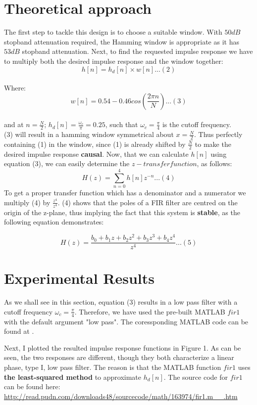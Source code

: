 \documentclass[12pt]{IEEEtran}
\begin{document}
\section{Theoretical approach}
The first step to tackle this design is to choose a suitable window. With $ 50 dB$ stopband attenuation required, the Hamming window is appropriate as it has $53 dB$ stopband attenuation. Next, to find the requested impulse response we have to multiply both the desired impulse response and the window together:\\
\[h[n] = h_{d}[n] \times w[n] . . . (2)\] \\
Where:\\
\[w[n] = 0.54 - 0.46cos(\frac{2 \pi n}{N}) . . . (3)\]\\
and at $n = \frac{N}{2}$; $h_{d}[n] = \frac{\omega_{c}}{\pi} = 0.25$, such that $\omega_{c} = \frac{\pi}{4}$ is the cutoff frequency.\\
(3) will result in a hamming window symmetrical about $x = \frac{N}{2}$. Thus perfectly containing (1) in the window, since (1) is already shifted by $\frac{N}{2}$ to make the desired impulse response \textbf{causal}.
Now, that we can calculate $h[n]$ using equation (3), we can easily determine the $z-transfer function$, as follows:
\[H(z) = \sum_{n=0}^{4} h[n]z^{-n} . . . (4)\]
To get a proper transfer function which has a denominator and a numerator we multiply (4) by $\frac{z^{4}}{z^{4}}$. (4) shows that the poles of a FIR filter are centred on the origin of the z-plane, thus implying the fact that this system is \textbf{stable}, as the following equation demonstrates:

\[H(z) = \frac{b_{0} + b_{1}z + b_{2}z^{2} + b_{3}z^{3} + b_{4}z^{4}}{z^{4}}...(5)\]

\section{Experimental Results}
As we shall see in this section, equation (3) results in a low pass filter with a cutoff frequency $\omega_{c} = \frac{\pi}{4}$. Therefore, we have used the pre-built MATLAB $fir1$ with the default argument "low pass". The coressponding MATLAB code can be found at . 

Next, I plotted the resulted impulse response functions in Figure 1. As can be seen, the two responses are different, though they both characterize a linear phase, type I, low pass filter. The reason is that the MATLAB function $fir1$ uses \textbf{the least-squared method} to approximate $h_{d}[n]$. The source code for $fir1$ can be found here: \url{http://read.pudn.com/downloads48/sourcecode/math/163974/fir1.m__.htm}
\end{document}
